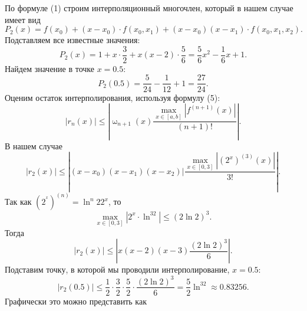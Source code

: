 \documentclass[a4paper, 12pt]{article}
\renewcommand{\leq}{\leqslant}
\renewcommand{\omega}{\upomega}
\begin{document}
	По формуле (1) строим интерполяционный многочлен, который в нашем случае имеет вид $$P_2(x) = f(x_0) + (x-x_0)\cdot f(x_0, x_1) + (x-x_0)(x-x_1)\cdot f(x_0,x_1,x_2).$$
	Подставляем все известные значения:
	$$P_2(x) = 1 + x\cdot \dfrac32 + x(x-2)\cdot \dfrac56 = \dfrac56x^2 - \dfrac16x + 1.$$
	Найдем значение в точке $x=0.5$:
	$$P_2(0.5) = \dfrac{5}{24} - \dfrac{1}{12} + 1 = \dfrac{27}{24}.$$
	Оценим остаток интерполирования, используя формулу (5):
	$$|r_n(x)| \leq \left|\omega_{n+1}(x) \dfrac{\underset{x\in[a,b]}{\max}|f^{(n+1)}(x)|}{(n+1)!}\right|.$$
	В нашем случае
	$$|r_2(x)| \leq \left|(x-x_0)(x-x_1)(x-x_2)| \dfrac{\underset{x\in[0,3]}{\max}|(2^x)^{(3)}(x)|}{3!}\right|.$$
	Так как $(2^^x)^{(n)} = \ln^n 2 2^x$, то $$\underset{x\in[0,3]}{\max}|2^x \cdot \ln^32|\leq (2\ln 2)^3.$$
	Тогда $$|r_2(x)|\leq \left|x(x-2)(x-3)\dfrac{(2\ln 2)^3}{6}\right|.$$
	Подставим точку, в которой мы проводили интерполирование, $x=0.5$:
	$$|r_2(0.5)|\leq \dfrac12\cdot \dfrac32\cdot\dfrac52\cdot\dfrac{(2\ln 2)^3}{6} = \dfrac52 \ln^32\approx 0.83256.$$
	Графически это можно представить как 
	\begin{center}\end{center}
\end{document}
